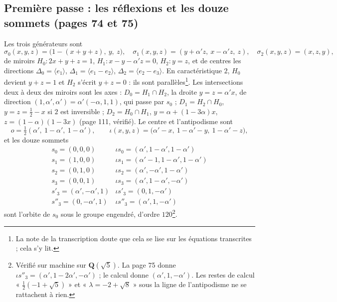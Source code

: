 \documentclass[11pt,a4paper]{article}
\begin{document}
\subsection*{Première passe : les réflexions et les douze sommets (pages 74 et 75)}

Les trois générateurs sont
\[
\sigma_0(x, y, z) = \bigl(1 - (x + y + z),\ y,\ z\bigr), \quad
\sigma_1(x, y, z) = (y + \alpha' z,\ x - \alpha' z,\ z), \quad
\sigma_2(x, y, z) = (x, z, y),
\]
de miroirs $H_0 : 2x + y + z = 1$, $H_1 : x - y - \alpha' z = 0$, $H_2 : y = z$,
et de centres les directions $\Delta_0 = \langle e_1 \rangle$, $\Delta_1 =
\langle e_1 - e_2 \rangle$, $\Delta_2 = \langle e_2 - e_3 \rangle$. En
caractéristique $2$, $H_0$ devient $y + z = 1$ et $H_2$ s'écrit $y + z = 0$ :
ils sont parallèles\footnote{La note de la transcription doute que cela se lise
sur les équations transcrites ; cela s'y lit.}. Les intersections deux à deux
des miroirs sont les axes : $D_0 = H_1 \cap H_2$, la droite $y = z = \alpha' x$,
de direction $(1, \alpha', \alpha') = \alpha'(-\alpha, 1, 1)$, qui passe par
$s_0$ ; $D_1 = H_2 \cap H_0$, $y = z = \tfrac12 - x$ si $2$ est inversible ;
$D_2 = H_0 \cap H_1$, $y = \alpha + (1 - 3\alpha)x$, $z = (1 - \alpha)(1 - 3x)$
(page 111, vérifié). Le centre et l'antipodisme sont
\[
o = \tfrac12(\alpha',\ 1 - \alpha',\ 1 - \alpha'), \qquad
\iota(x, y, z) = \bigl(\alpha' - x,\ 1 - \alpha' - y,\ 1 - \alpha' - z\bigr) ,
\]
et les douze sommets
\[
\begin{array}{ll}
s_0 = (0, 0, 0) & \iota s_0 = (\alpha', 1 - \alpha', 1 - \alpha') \\
s_1 = (1, 0, 0) & \iota s_1 = (\alpha' - 1, 1 - \alpha', 1 - \alpha') \\
s_2 = (0, 1, 0) & \iota s_2 = (\alpha', -\alpha', 1 - \alpha') \\
s_3 = (0, 0, 1) & \iota s_3 = (\alpha', 1 - \alpha', -\alpha') \\
s'_3 = (\alpha', -\alpha', 1) & \iota s'_3 = (0, 1, -\alpha') \\
s''_3 = (0, -\alpha', 1) & \iota s''_3 = (\alpha', 1, -\alpha')
\end{array}
\]
sont l'orbite de $s_0$ sous le groupe engendré, d'ordre $120$\footnote{Vérifié
sur machine sur $\mathbf{Q}(\sqrt 5)$. La page 75 donne $\iota s''_3 = (\alpha',
1 - 2\alpha', -\alpha')$ ; le calcul donne $(\alpha', 1, -\alpha')$. Les restes de
calcul « $\tfrac12(-1 + \sqrt 5)$ » et « $\lambda = -2 + \sqrt 8$ » sous la
ligne de l'antipodisme ne se rattachent à rien.}.
\end{document}
